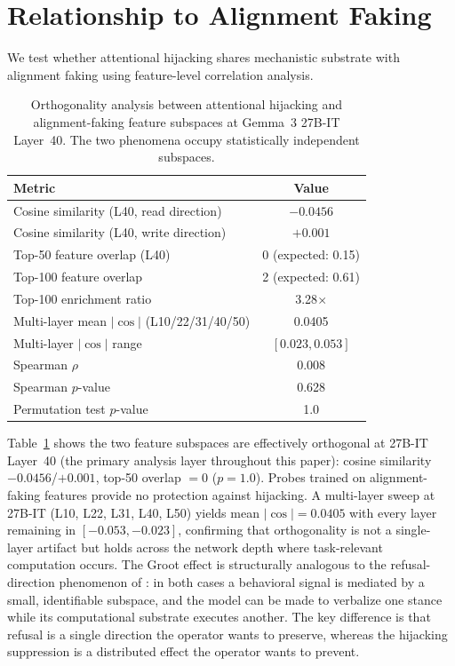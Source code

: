 \documentclass[10pt,twocolumn]{article}
\begin{document}
\section{Relationship to Alignment Faking}
\label{sec:orthogonality}

We test whether attentional hijacking shares mechanistic substrate with alignment faking \citep{greenblatt2024alignment} using feature-level correlation analysis.

\begin{table}[t]
\centering
\caption{Orthogonality analysis between attentional hijacking and alignment-faking feature subspaces at Gemma~3 27B-IT Layer~40. The two phenomena occupy statistically independent subspaces.}
\label{tab:orthogonality}
\small
\begin{tabular}{@{}lc@{}}
\toprule
\textbf{Metric} & \textbf{Value} \\
\midrule
Cosine similarity (L40, read direction)  & $-0.0456$ \\
Cosine similarity (L40, write direction) & $+0.001$ \\
Top-50 feature overlap (L40)              & 0 (expected: 0.15) \\
Top-100 feature overlap                   & 2 (expected: 0.61) \\
Top-100 enrichment ratio                  & 3.28$\times$ \\
Multi-layer mean $|\cos|$ (L10/22/31/40/50) & 0.0405 \\
Multi-layer $|\cos|$ range                & $[0.023, 0.053]$ \\
Spearman $\rho$                           & 0.008 \\
Spearman $p$-value                        & 0.628 \\
Permutation test $p$-value                & 1.0 \\
\bottomrule
\end{tabular}
\end{table}

Table~\ref{tab:orthogonality} shows the two feature subspaces are effectively orthogonal at 27B-IT Layer~40 (the primary analysis layer throughout this paper): cosine similarity $-0.0456$/$+0.001$, top-50 overlap $= 0$ ($p = 1.0$).
Probes trained on alignment-faking features \citep{bricken2023towards} provide no protection against hijacking.
A multi-layer sweep at 27B-IT (L10, L22, L31, L40, L50) yields mean $|\cos| = 0.0405$ with every layer remaining in $[-0.053, -0.023]$, confirming that orthogonality is not a single-layer artifact but holds across the network depth where task-relevant computation occurs.
The Groot effect is structurally analogous to the refusal-direction phenomenon of \citet{arditi2024refusal}: in both cases a behavioral signal is mediated by a small, identifiable subspace, and the model can be made to verbalize one stance while its computational substrate executes another. The key difference is that refusal is a single direction the operator wants to preserve, whereas the hijacking suppression is a distributed effect the operator wants to prevent.
\end{document}
